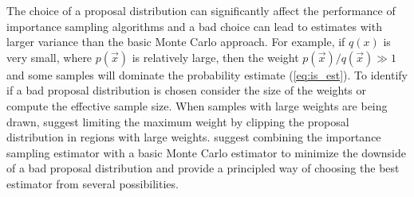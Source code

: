 The choice of a proposal distribution can significantly affect the performance of importance sampling algorithms and a bad choice can lead to estimates with larger variance than the basic Monte Carlo approach. For example, if $q(x)$ is very small, where $p(\vec{x})$ is relatively large, then the weight $p(\vec{x})/q(\vec{x}) \gg 1$ and some samples will dominate the probability estimate (\cref{eq:is_est}). To identify if a bad proposal distribution is chosen consider the size of the weights or compute the effective sample size. When samples with large weights are being drawn, \textcite{kim2016improving} suggest limiting the maximum weight by clipping the proposal distribution in regions with large weights. \textcite{uesato2018rigorous} suggest combining the importance sampling estimator with a basic Monte Carlo estimator to minimize the downside of a bad proposal distribution and \textcite{neufeld2014adaptive} provide a principled way of choosing the best estimator from several possibilities. 